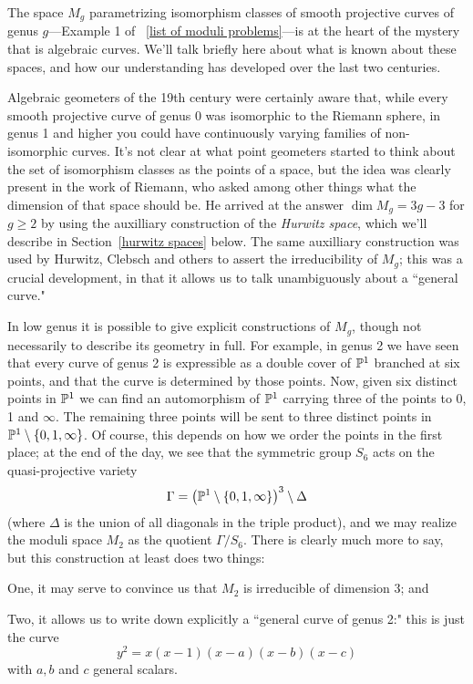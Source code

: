 The space $M_g$ parametrizing isomorphism classes of smooth projective curves of genus $g$---Example 1 of ~\ref{list of moduli problems}---is at the heart of the mystery that is algebraic curves. We'll talk briefly here about what is known about these spaces, and how our understanding has developed over the last two centuries.

Algebraic geometers of the 19th century were certainly aware that, while every smooth projective curve of genus 0 was isomorphic to the Riemann sphere, in  genus 1 and higher you could have continuously varying families of non-isomorphic curves. It's not clear at what point geometers started to think about the set of isomorphism classes as the points of a space, but the idea was clearly present in the work of Riemann, who asked among other things what the dimension of that space should be. He arrived at the answer $\dim M_g = 3g-3$ for $g \geq 2$ by using the auxilliary construction of the \emph{Hurwitz space}, which we'll describe in Section~\ref{hurwitz spaces} below. The same auxilliary construction was used by Hurwitz, Clebsch and others to assert the irreducibility of $M_g$; this was a crucial development, in that it allows us to talk unambiguously about a ``general curve."

In low genus it is possible to give explicit constructions of $M_g$, though not necessarily to describe its geometry in full. For example, in genus 2 we have seen that every curve of genus 2 is expressible as a double cover of ${\mathbb P}^1$ branched at six points, and  that the curve is determined by those points. Now, given six distinct points in ${\mathbb P}^1$ we can find an automorphism of ${\mathbb P}^1$ carrying three of the points to 0, 1 and $\infty$. The remaining three points will be sent to three distinct points in ${\mathbb P}^1 \setminus \{0, 1, \infty \} $. Of course, this depends on how we order the points in the first place; at the end of the day, we see that the symmetric group $S_6$ acts on the quasi-projective variety
$$
\Gamma = \left( {\mathbb P}^1 \setminus \{0, 1, \infty \} \right)^3 \setminus \Delta
$$
(where $\Delta$ is the union of all diagonals in the triple product), and we may realize the moduli space $M_2$ as the quotient $\Gamma/S_6$. There is clearly much more to say, but this construction at least does two things:

One, it may serve to convince us that $M_2$ is irreducible of dimension 3; and

Two, it allows us to write down explicitly a ``general curve of genus 2:" this is just the curve
$$
y^2 = x(x-1)(x-a)(x-b)(x-c)
$$
with $a, b$ and $c$ general scalars.

